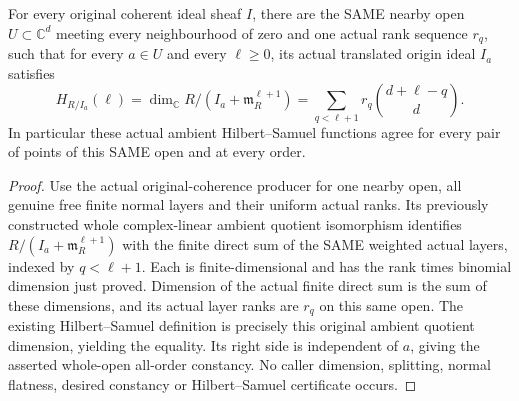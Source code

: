 \begin{theorem}
\label{hir:relative-normal-original-nearby-ambient-hs-convolution}
\leanok
For every original coherent ideal sheaf $I$, there are the SAME nearby
open $U\subset\mathbb C^d$ meeting every neighbourhood of zero and one
actual rank sequence $r_q$, such that for every $a\in U$ and every
$\ell\geq0$, its actual translated origin ideal $I_a$ satisfies
\[
 H_{R/I_a}(\ell)=\dim_{\mathbb C}R/(I_a+\mathfrak m_R^{\ell+1})
 =\sum_{q<\ell+1}r_q\binom{d+\ell-q}{d}.
\]
In particular these actual ambient Hilbert--Samuel functions agree for
every pair of points of this SAME open and at every order.
\end{theorem}
\begin{proof}
Use the actual original-coherence producer for one nearby open, all genuine
free finite normal layers and their uniform actual ranks. Its previously
constructed whole complex-linear ambient quotient isomorphism identifies
$R/(I_a+\mathfrak m_R^{\ell+1})$ with the finite direct sum of the SAME
weighted actual layers, indexed by $q<\ell+1$. Each is finite-dimensional
and has the rank times binomial dimension just proved. Dimension of the
actual finite direct sum is the sum of these dimensions, and its actual
layer ranks are $r_q$ on this same open. The existing Hilbert--Samuel
definition is precisely this original ambient quotient dimension, yielding
the equality. Its right side is independent of $a$, giving the asserted
whole-open all-order constancy. No caller dimension, splitting, normal
flatness, desired constancy or Hilbert--Samuel certificate occurs.
\end{proof}
